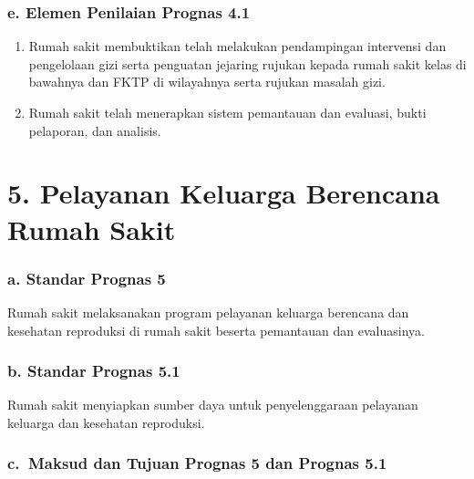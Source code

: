 \documentclass[
]{book}
\providecommand{\tightlist}{%
  \setlength{\itemsep}{0pt}\setlength{\parskip}{0pt}}
\begin{document}
\hypertarget{e.-elemen-penilaian-prognas-4.1}{%
\subsubsection*{e. Elemen Penilaian Prognas 4.1}\label{e.-elemen-penilaian-prognas-4.1}}

\begin{enumerate}
\def\labelenumi{\arabic{enumi}.}
\tightlist
\item
  Rumah sakit membuktikan telah melakukan pendampingan intervensi dan pengelolaan gizi serta penguatan jejaring rujukan kepada rumah sakit kelas di bawahnya dan FKTP di wilayahnya serta rujukan masalah gizi.
\item
  Rumah sakit telah menerapkan sistem pemantauan dan evaluasi, bukti pelaporan, dan analisis.
\end{enumerate}

\hypertarget{pelayanan-keluarga-berencana-rumah-sakit}{%
\section*{5. Pelayanan Keluarga Berencana Rumah Sakit}\label{pelayanan-keluarga-berencana-rumah-sakit}}

\hypertarget{a.-standar-prognas-5}{%
\subsubsection*{a. Standar Prognas 5}\label{a.-standar-prognas-5}}

Rumah sakit melaksanakan program pelayanan keluarga berencana dan kesehatan reproduksi di rumah sakit beserta pemantauan dan evaluasinya.

\hypertarget{b.-standar-prognas-5.1}{%
\subsubsection*{b. Standar Prognas 5.1}\label{b.-standar-prognas-5.1}}

Rumah sakit menyiapkan sumber daya untuk penyelenggaraan pelayanan keluarga dan kesehatan reproduksi.

\hypertarget{c.-maksud-dan-tujuan-prognas-5-dan-prognas-5.1}{%
\subsubsection*{c.~Maksud dan Tujuan Prognas 5 dan Prognas 5.1}\label{c.-maksud-dan-tujuan-prognas-5-dan-prognas-5.1}}
\end{document}
